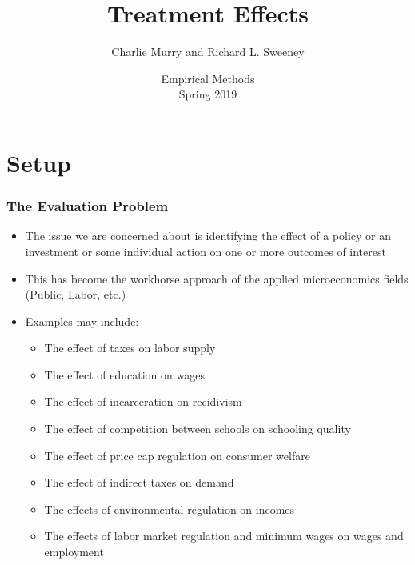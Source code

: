 

\title{Treatment Effects}
\author{Charlie Murry and Richard L. Sweeney}
\date{Empirical Methods \\ Spring 2019}




\begin{frame}
    \titlepage
\end{frame}

\begin{frame}
    \tableofcontents  
\end{frame}


\section{Setup}

\begin{frame}
\frametitle{The Evaluation Problem}
\begin{itemize}
\item The issue we are concerned about is identifying the effect of a policy or an investment or some individual action on one or more outcomes of interest
\item This has become the workhorse approach of the applied microeconomics fields (Public, Labor, etc.)
\item Examples may include:
\begin{itemize}
\item The effect of taxes on labor supply
\item The effect of education on wages
\item The effect of incarceration on recidivism
\item The effect of competition between schools on schooling quality
\item The effect of price cap regulation on consumer welfare
\item The effect of indirect taxes on demand
\item The effects of environmental regulation on incomes
\item The effects of labor market regulation and minimum wages on wages and employment
\end{itemize}
\end{itemize}
\end{frame}

